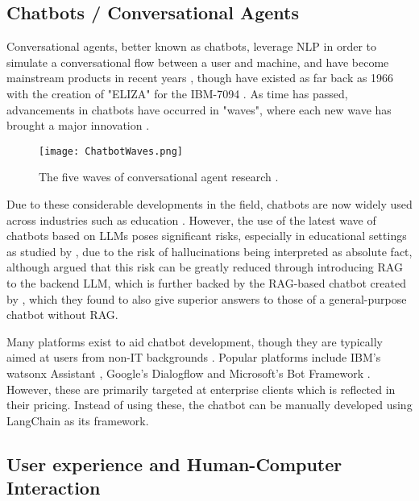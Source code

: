 \subsection{Chatbots / Conversational Agents}

Conversational agents, better known as chatbots, leverage NLP in order to simulate a conversational flow 
between a user and machine, and have become mainstream products in recent years \autocite{liao_all_2018},
though have existed as far back as 1966 with the creation of "ELIZA" for the IBM-7094 \autocite{weizenbaum_elizacomputer_1966}.
As time has passed, advancements in chatbots have occurred in "waves", where each new wave has brought a major innovation \autocite{schobel_charting_2024}.

\begin{figure}[H] 
    \centering
    \texttt{[image: ChatbotWaves.png]}
    \caption{The five waves of conversational agent research \autocite{schobel_charting_2024}.}
    \label{fig:ChatbotWaves}
\end{figure}

Due to these considerable developments in the field, chatbots are now widely used 
across industries such as education \autocite{kuhail_interacting_2023}. However, the use of the latest wave of chatbots based on LLMs
poses significant risks, especially in educational settings as studied by \textcite{neumann_llm-driven_2024},
due to the risk of hallucinations being interpreted as absolute fact, although \textcite{shuster_retrieval_2021} 
argued that this risk can be greatly reduced through introducing RAG to the backend LLM, which is further backed 
by the RAG-based chatbot created by \textcite{ge_development_2023}, which they found to also give superior answers
to those of a general-purpose chatbot without RAG.  


Many platforms exist to aid chatbot development, though they are typically aimed at users from non-IT backgrounds 
\autocite{srivastava_desirable_2020}. Popular platforms include IBM's watsonx Assistant \autocite{ibm_ibm_2024},
Google's Dialogflow \autocite{google_conversational_nodate} and Microsoft's Bot Framework \autocite{microsoft_microsoft_nodate}.
However, these are primarily targeted at enterprise clients which is reflected in their pricing. Instead of using these,
the chatbot can be manually developed using LangChain as its framework.



\subsection{User experience and Human-Computer Interaction}

